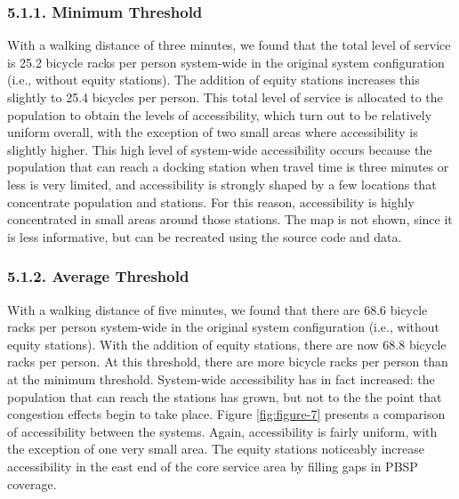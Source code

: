 \documentclass[]{elsarticle} %
\providecommand{\DIFaddend}{} %
\DeclareRobustCommand{\DIFaddend}{\DIFOaddend \let\includegraphics\DIFOincludegraphics} %
\begin{document}
\DIFaddend \hypertarget{minimum-threshold}{%
\subsubsection{5.1.1. Minimum Threshold}\label{minimum-threshold}}

With a walking distance of three minutes, we found that the total level
of service is 25.2 bicycle racks per person system-wide in the original
system configuration (i.e., without equity stations). The addition of
equity stations increases this slightly to 25.4 bicycles per person.
This total level of service is allocated to the population to obtain the
levels of accessibility, which turn out to be relatively uniform
overall, with the exception of two small areas where accessibility is
slightly higher. This high level of system-wide accessibility occurs
because the population that can reach a docking station when travel time
is three minutes or less is very limited, and accessibility is strongly
shaped by a few locations that concentrate population and stations. For
this reason, accessibility is highly concentrated in small areas around
those stations. The map is not shown, since it is less informative, but
can be recreated using the source code and data.

\hypertarget{average-threshold}{%
\subsubsection{5.1.2. Average Threshold}\label{average-threshold}}

With a walking distance of five minutes, we found that there are 68.6
bicycle racks per person system-wide in the original system
configuration (i.e., without equity stations). With the addition of
equity stations, there are now 68.8 bicycle racks per person. At this
threshold, there are more bicycle racks per person than at the minimum
threshold. System-wide accessibility has in fact increased: the
population that can reach the stations has grown, but not to the the
point that congestion effects begin to take place. Figure
\ref{fig:figure-7} presents a comparison of accessibility between the
systems. Again, accessibility is fairly uniform, with the exception of
one very small area. The equity stations noticeably increase
accessibility in the east end of the core service area by filling gaps
in PBSP coverage.
\end{document}
